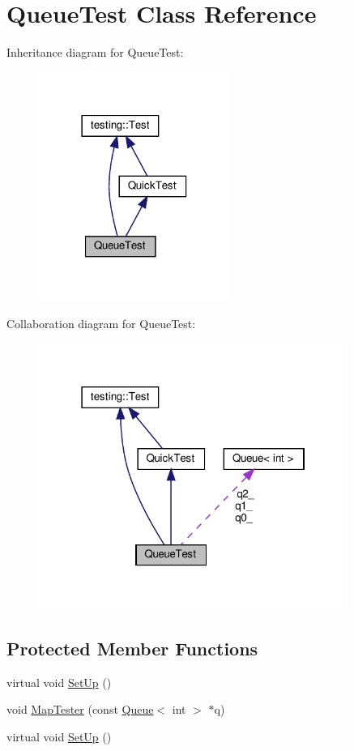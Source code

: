 \hypertarget{class_queue_test}{}\section{Queue\+Test Class Reference}
\label{class_queue_test}


Inheritance diagram for Queue\+Test\+:
\nopagebreak
\begin{figure}[H]
\begin{center}
\leavevmode
\includegraphics[width=177pt]{class_queue_test__inherit__graph}
\end{center}
\end{figure}


Collaboration diagram for Queue\+Test\+:
\nopagebreak
\begin{figure}[H]
\begin{center}
\leavevmode
\includegraphics[width=286pt]{class_queue_test__coll__graph}
\end{center}
\end{figure}
\subsection*{Protected Member Functions}
\begin{DoxyCompactItemize}
\item 
virtual void \hyperlink{class_queue_test_a91e69958f086239a523864d6b94ab174}{Set\+Up} ()
\item 
void \hyperlink{class_queue_test_a7f1661cd16c428a130d6ac1e4246eaab}{Map\+Tester} (const \hyperlink{class_queue}{Queue}$<$ int $>$ $\ast$q)
\item 
virtual void \hyperlink{class_queue_test_a91e69958f086239a523864d6b94ab174}{Set\+Up} ()
\end{DoxyCompactItemize}
